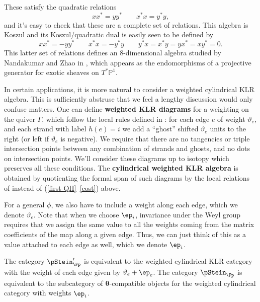 \begin{example}
These satisfy the quadratic relations 
\begin{equation}
    xx^*=yy^*\qquad x^*x=y^*y,
\end{equation}
and it's easy to check that these are a complete set of relations.  This algebra is Koszul and its Koszul/quadratic dual is easily seen to be defined by
\begin{equation}
    xx^*=-yy^*\qquad x^*x=-y^*y\qquad y^*x=x^*y=yx^*=xy^*=0.
\end{equation}
This latter set of relations defines an 8-dimensional algebra studied by Nandakumar and Zhao in \cite{NaZh}, which appears as the endomorphisms of a projective generator for exotic sheaves on $T^*\mathbb{P}^1$.  
\end{example}




In certain applications, it is more natural to consider a weighted
cylindrical KLR algebra.  This is sufficiently abstruse that we feel a
lengthy discussion would only confuse matters.  One can define {\bf
  weighted KLR diagrams} for a weighting on the quiver $\Gamma$, which
follow the local rules defined in \cite{WebwKLR}: for each edge $e$ of
weight $\vartheta_e$, and each strand with label $h(e)=i$ we add a
``ghost'' shifted $\vartheta_e$ units to the right (or left if
$\vartheta_e$ is negative).  We require that there are no tangencies or triple
intersection points between any combination of strands and ghosts, and
no dots on intersection points. 
We'll consider these diagrams up to isotopy which preserves all these
conditions.  The {\bf cylindrical weighted KLR algebra} is obtained by
quotienting the formal span of such diagrams by the local relations of
\cite[Def. 2.4]{WebwKLR} instead of (\ref{first-QH}--\ref{cost})
above. 

For a general $\phi$, we also have to include a weight along each
edge, which we denote $\vartheta_e$.  Note that when we choose $\ep_i$, invariance under the Weyl group
requires that we assign the same value to all the weights coming from
the matrix coefficients of the map along a given edge.  Thus, we can
just think of this as a value attached to each edge as well, which we
denote $\ep_i$.  
\begin{lemma}\label{lem:weighted-pStein}
The category $\pStein_\Fp'$ is equivalent to the weighted cylindrical
KLR category with the weight of each edge given by $\vartheta_e+\ep_e$.  The category $\pStein_\Fp$ is equivalent to the subcategory of $\boldsymbol{\theta}$-compatible objects for the weighted cylindrical category with weights $\ep_i$.  
\end{lemma}

